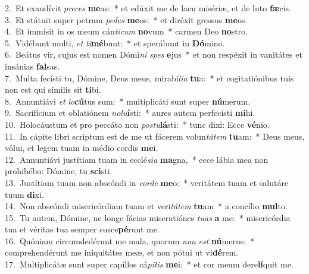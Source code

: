 {2.~}Et exaudívit \textit{pre}\textit{ces} \textbf{me}as:~* et edúxit me de lacu misériæ, et de luto \textbf{fæ}cis.\\
{3.~}Et státuit super petram \textit{pe}\textit{des} \textbf{me}os:~* et diréxit gressus \textbf{me}os.\\
{4.~}Et immísit in os meum cán\textit{ti}\textit{cum} \textbf{no}vum~* carmen Deo \textbf{no}stro.\\
{5.~}Vidébunt multi, \textit{et} \textit{ti}\textbf{mé}bunt:~* et sperábunt in \textbf{Dó}mino.\\
{6.~}Beátus vir, cujus est nomen Dómi\textit{ni} \textit{spes} \textbf{e}jus~* et non respéxit in vanitátes et insánias \textbf{fal}sas.\\
{7.~}Multa fecísti tu, Dómine, Deus meus, mirabí\textit{li}\textit{a} \textbf{tu}a:~* et cogitatiónibus tuis non est qui símilis sit \textbf{ti}bi.\\
{8.~}Annuntiávi \textit{et} \textit{lo}\textbf{cú}tus sum:~* multiplicáti sunt super \textbf{nú}merum.\\
{9.~}Sacrifícium et oblatiónem \textit{no}\textit{lu}\textbf{í}sti:~* aures autem perfecísti \textbf{mi}hi.\\
{10.~}Holocáustum et pro peccáto non \textit{po}\textit{stu}\textbf{lá}sti:~* tunc dixi: Ecce \textbf{vé}nio.\\
{11.~}In cápite libri scriptum est de me ut fácerem volun\textit{tá}\textit{tem} \textbf{tu}am:~* Deus meus, vólui, et legem tuam in médio cordis \textbf{me}i.\\
{12.~}Annuntiávi justítiam tuam in ecclé\textit{si}\textit{a} \textbf{ma}gna,~* ecce lábia mea non prohibébo: Dómine, tu \textbf{sci}sti.\\
{13.~}Justítiam tuam non abscóndi in \textit{cor}\textit{de} \textbf{me}o:~* veritátem tuam et salutáre tuum \textbf{di}xi.\\
{14.~}Non abscóndi misericórdiam tuam et veri\textit{tá}\textit{tem} \textbf{tu}am~* a concílio \textbf{mul}to.\\
{15.~}Tu autem, Dómine, ne longe fácias miseratiónes \textit{tu}\textit{as} \textbf{a} me:~* misericórdia tua et véritas tua semper susce\textbf{pé}runt me.\\
{16.~}Quóniam circumdedérunt me mala, quorum \textit{non} \textit{est} \textbf{nú}merus:~* comprehendérunt me iniquitátes meæ, et non pótui ut vi\textbf{dé}rem.\\
{17.~}Multiplicátæ sunt super capíllos cá\textit{pi}\textit{tis} \textbf{me}i:~* et cor meum dere\textbf{lí}quit me.\\
